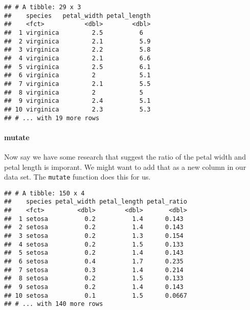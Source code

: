 \documentclass[]{article}
\newenvironment{Shaded}{\begin{snugshade}}{\end{snugshade}}
\newcommand{\DataTypeTok}[1]{\textcolor[rgb]{0.13,0.29,0.53}{#1}}
\newcommand{\KeywordTok}[1]{\textcolor[rgb]{0.13,0.29,0.53}{\textbf{#1}}}
\newcommand{\NormalTok}[1]{#1}
\newcommand{\OperatorTok}[1]{\textcolor[rgb]{0.81,0.36,0.00}{\textbf{#1}}}
\newcommand{\StringTok}[1]{\textcolor[rgb]{0.31,0.60,0.02}{#1}}
\let\oldparagraph\paragraph
\renewcommand{\paragraph}[1]{\oldparagraph{#1}\mbox{}}
\begin{document}
\begin{verbatim}
## # A tibble: 29 x 3
##    species   petal_width petal_length
##    <fct>           <dbl>        <dbl>
##  1 virginica         2.5          6  
##  2 virginica         2.1          5.9
##  3 virginica         2.2          5.8
##  4 virginica         2.1          6.6
##  5 virginica         2.5          6.1
##  6 virginica         2            5.1
##  7 virginica         2.1          5.5
##  8 virginica         2            5  
##  9 virginica         2.4          5.1
## 10 virginica         2.3          5.3
## # ... with 19 more rows
\end{verbatim}

\hypertarget{mutate}{%
\paragraph{mutate}\label{mutate}}

Now say we have some research that suggest the ratio of the petal width
and petal length is imporant. We might want to add that as a new column
in our data set. The \texttt{mutate} function does this for us.

\begin{Shaded}
\end{Shaded}

\begin{verbatim}
## # A tibble: 150 x 4
##    species petal_width petal_length petal_ratio
##    <fct>         <dbl>        <dbl>       <dbl>
##  1 setosa          0.2          1.4      0.143 
##  2 setosa          0.2          1.4      0.143 
##  3 setosa          0.2          1.3      0.154 
##  4 setosa          0.2          1.5      0.133 
##  5 setosa          0.2          1.4      0.143 
##  6 setosa          0.4          1.7      0.235 
##  7 setosa          0.3          1.4      0.214 
##  8 setosa          0.2          1.5      0.133 
##  9 setosa          0.2          1.4      0.143 
## 10 setosa          0.1          1.5      0.0667
## # ... with 140 more rows
\end{verbatim}
\end{document}
